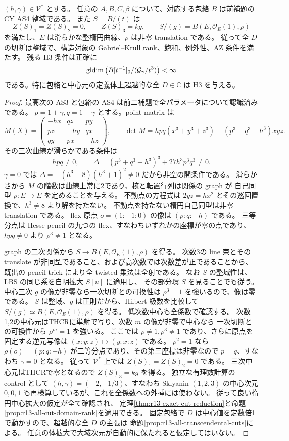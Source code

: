 \begin{proposition}[明示的開集合上の全中心値の帰着]
\label{prop:integrated-actual-h3}
$(h,\gamma)\in\mathcal V^*$ とする。
任意の $A,B,C,\beta$ について、対応する包絡 $B$ は前補題の CY AS4 整域である。
また $S=B/(t)$ は
\[
 Z(S)_1=Z(S)_2=0,\qquad Z(S)_3=kg,\qquad
 S/(g)=B(E,\mathcal O_E(1),\rho)
\]
を満たし、$E$ は滑らかな整楕円曲線、$\rho$ は非零 translation である。
従って全 $D$ の切断は整域で、構造対象の Gabriel--Krull rank、飽和、例外性、AZ 条件を満たす。
残る H3 条件は正確に
\[
 \operatorname{gldim}\left(B[t^{-1}]_0/(\mathcal G_\gamma/t^3)\right)<\infty
\]
である。特に包絡と中心元の定義体上超越的な全 $D\in\mathbb C$ は H3 を与える。
\end{proposition}
\begin{proof}
最高次の AS3 と包絡の AS4 は前二補題で全パラメータについて認識済みである。
$p=1+\gamma,q=1-\gamma$ とする。point matrix は
\[
 M(X)=\begin{pmatrix}-hx&qz&py\\pz&-hy&qx\\qy&px&-hz\end{pmatrix},\qquad
 \det M=hpq(x^3+y^3+z^3)+(p^3+q^3-h^3)xyz.
\]
その三次曲線が滑らかである条件は
\[
 hpq\ne0,\qquad
 \Delta=(p^3+q^3-h^3)^3+27h^3p^3q^3\ne0.
\]
$\gamma=0$ では $\Delta=-(h^3-8)(h^3+1)^2\ne0$ だから非空の開条件である。
滑らかさから $M$ の階数は曲線上常に2であり、核と転置行列は関係の graph が
自己同型 $\rho:E\to E$ を定めることを与える。
不動点の方程式は $2yz=hx^2$ とその巡回置換で、$h^3\ne8$ より解を持たない。
不動点を持たない楕円自己同型は非零 translation である。
flex 原点 $o=(1:-1:0)$ の像は $(p:q:-h)$ である。
三等分点は Hesse pencil の九つの flex、すなわちいずれかの座標が零の点であり、
$hpq\ne0$ より $\rho^3\ne1$ となる。

graph の二次関係から $S\to B(E,\mathcal O_E(1),\rho)$ を得る。
次数3の line 束とその translate が非同型であること、および高次数では次数差が正であることから、
既出の pencil trick により全 twisted 乗法は全射である。
なお $S$ の整域性は、LBS の同じ系を自明拡大 $S[u]$ に適用し、
その部分環 $S$ を見ることでも従う。中心三次 $g$ の像が非零なら一次切断との可換性は $\rho^3=1$ を強いるので、像は零である。
$S$ は整域、$g$ は正則だから、Hilbert 級数を比較して
$S/(g)\simeq B(E,\mathcal O_E(1),\rho)$ を得る。
低次数中心も全係数で確認する。
次数1,2の中心元はTHCRに単射で写り、次数 $m$ の像が非零で中心なら
一次切断との可換性から $\rho^m=1$ を強いる。
ここでは $\rho\ne1,\rho^3\ne1$ であり、さらに原点を固定する逆元写像は $(x:y:z)\mapsto(y:x:z)$ である。
$\rho^2=1$ なら $\rho(o)=(p:q:-h)$ が二等分点であり、その第三座標は非零なので $p=q$、すなわち $\gamma=0$ となる。
従って $\mathcal V^*$ 上では $Z(S)_1=Z(S)_2=0$ である。
三次中心元はTHCRで零となるので $Z(S)_3=kg$ を得る。
独立な有理数計算の control として $(h,\gamma)=(-2,-1/3)$、すなわち
Sklyanin $(1,2,3)$ の中心次元 $0,0,1$ も再検算しているが、これを全係数への外挿には使わない。
従って良い楕円中心拡大の仮定が全て確認され、
定理\ref{thm:r13-exact-cut-reduction}と命題\ref{prop:r13-all-cut-domain-rank}を適用できる。
固定包絡で $D$ は中心値を定数倍1で動かすので、超越的な全 $D$ の主張は
命題\ref{prop:r13-all-transcendental-cuts}による。
任意の体拡大で大域次元が自動的に保たれると仮定してはいない。
\end{proof}

